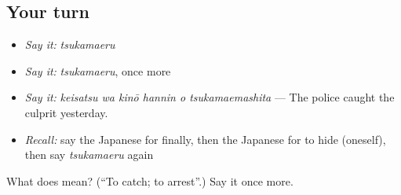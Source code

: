 \subsection*{Your turn}
\begin{itemize}
\raggedright
  \item \emph{Say it:} \emph{tsukamaeru}
  \item \emph{Say it:} \emph{tsukamaeru}, once more
  \item \emph{Say it:} \emph{keisatsu wa kinō hannin o tsukamaemashita} — The police caught the culprit yesterday.
  \item \emph{Recall:} say the Japanese for finally, then the Japanese for to hide (oneself), then say \emph{tsukamaeru} again
\end{itemize}

\begin{tcolorbox}[breakable,colback=teal!4,colframe=teal!35!black,title={Before you move on}]
What does  mean? (\textquotedblleft{}To catch; to arrest\textquotedblright{}.) Say it once more.
\end{tcolorbox}
